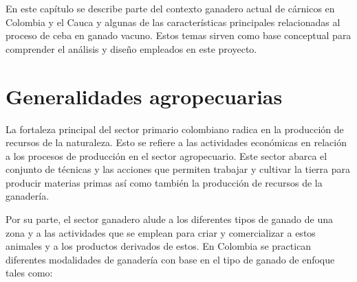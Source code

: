 
En este capítulo se describe parte del contexto ganadero actual de cárnicos en Colombia y el Cauca y algunas de las características principales relacionadas al proceso de ceba en ganado vacuno. Estos temas sirven como base conceptual para comprender el análisis y diseño empleados en este proyecto.





\section{Generalidades agropecuarias} \label{tgan}


La fortaleza principal del sector primario colombiano radica en la producción de recursos de la naturaleza. Esto se refiere a las actividades económicas en relación a los procesos de producción en el sector agropecuario. Este sector abarca el conjunto de técnicas y las acciones que permiten trabajar y cultivar la tierra para producir materias primas así como también la producción de recursos de la ganadería.

Por su parte, el sector ganadero alude a los diferentes tipos de ganado de una zona y a las actividades que se emplean para criar y comercializar a estos animales y a los productos derivados de estos. En Colombia se practican diferentes modalidades de ganadería con base en el tipo de ganado de enfoque tales como:

